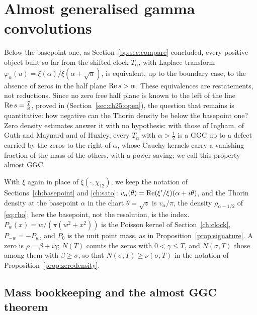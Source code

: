 \section{Almost generalised gamma convolutions}\label{ch:almost}

Below the basepoint one, as Section~\ref{bp:sec:compare} concluded, every positive object built so far from the shifted clock $T_\alpha$, with Laplace transform $\varphi_\alpha(u)=\xi(\alpha)/\xi(\alpha+\sqrt u)$, is equivalent, up to the boundary case, to the absence of zeros in the half plane $\operatorname{Re} s>\alpha$. These equivalences are restatements, not reductions. Since no zero free half plane is known to the left of the line $\operatorname{Re} s=\frac78$, proved in \cite{OAI26a} (Section~\ref{sec:ch25:open}), the question that remains is quantitative: how negative can the Thorin density be below the basepoint one? Zero density estimates answer it with no hypothesis: with those of Ingham, of Guth and Maynard and of Huxley, every $T_\alpha$ with $\alpha>\frac12$ is a GGC up to a defect carried by the zeros to the right of $\alpha$, whose Cauchy kernels carry a vanishing fraction of the mass of the others, with a power saving; we call this property almost GGC.

With $\xi$ again in place of $\xi(\cdot,\chi_{12})$, we keep the notation of Sections~\ref{ch:basepoint} and \ref{ch:sato}: $v_\alpha(\theta)=\operatorname{Re}(\xi'/\xi)(\alpha+i\theta)$, and the Thorin density at the basepoint $\alpha$ in the chart $\theta=\sqrt z$ is $v_\alpha/\pi$, the density $\rho_{\alpha-1/2}$ of \eqref{eq:rho}; here the basepoint, not the resolution, is the index. $P_w(x)=w/(\pi(w^2+x^2))$ is the Poisson kernel of Section~\ref{ch:clock}, $P_{-w}=-P_w$, and $P_0$ is the unit point mass, as in Proposition~\ref{prop:signature}. A zero is $\rho=\beta+i\gamma$; $N(T)$ counts the zeros with $0<\gamma\le T$, and $N(\sigma,T)$ those among them with $\beta\ge\sigma$, so that $N(\sigma,T)\ge\nu(\sigma,T)$ in the notation of Proposition~\ref{prop:zerodensity}.

\subsection{Mass bookkeeping and the almost GGC theorem}\label{ag:sec:almost}

